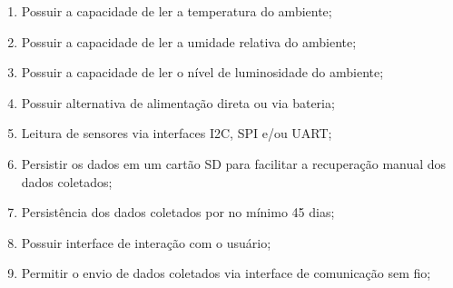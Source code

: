     \begin{enumerate}
        \item Possuir a capacidade de ler a temperatura do ambiente;
        \item Possuir a capacidade de ler a umidade relativa do ambiente;
        \item Possuir a capacidade de ler o nível de luminosidade do ambiente;
        \item Possuir alternativa de alimentação direta ou via bateria;
        \item Leitura de sensores via interfaces \gls{I2C}, \gls{SPI} e/ou \gls{UART};
        \item Persistir os dados em um cartão SD para facilitar a recuperação manual dos dados coletados;
        \item Persistência dos dados coletados por no mínimo 45 dias;
        \item Possuir interface de interação com o usuário;
        \item Permitir o envio de dados coletados via interface de comunicação sem fio;

    \end{enumerate}

